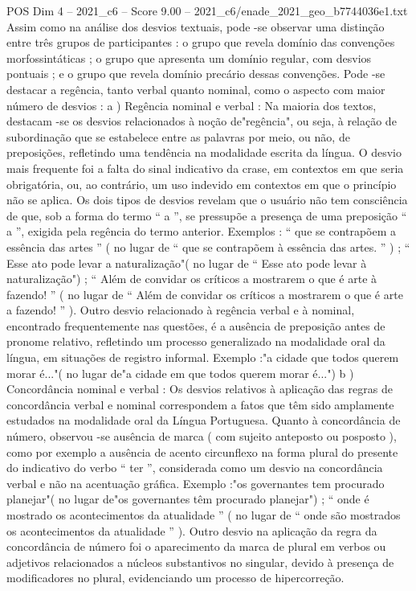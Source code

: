 \begin{textsample}{POS Dim 4 – 2021\_c6 – Score 9.00 – 2021\_c6/enade\_2021\_geo\_b7744036e1.txt}
Assim como na análise dos desvios textuais, pode -se observar uma distinção entre três grupos de participantes : o grupo que revela domínio das convenções morfossintáticas ; o grupo que apresenta um domínio regular, com desvios pontuais ; e o grupo que revela domínio precário dessas convenções.
Pode -se destacar a regência, tanto verbal quanto nominal, como o aspecto com maior número de desvios : a ) Regência nominal e verbal : Na maioria dos textos, destacam -se os desvios relacionados à noção de"regência", ou seja, à relação de subordinação que se estabelece entre as palavras por meio, ou não, de preposições, refletindo uma tendência na modalidade escrita da língua.
O desvio mais frequente foi a falta do sinal indicativo da crase, em contextos em que seria obrigatória, ou, ao contrário, um uso indevido em contextos em que o princípio não se aplica.
Os dois tipos de desvios revelam que o usuário não tem consciência de que, sob a forma do termo “ a ”, se pressupõe a presença de uma preposição “ a ”, exigida pela regência do termo anterior.
Exemplos : “ que se contrapõem a essência das artes ” ( no lugar de “ que se contrapõem à essência das artes. ” ) ; “ Esse ato pode levar a naturalização"( no lugar de “ Esse ato pode levar à naturalização") ; “ Além de convidar os críticos a mostrarem o que é arte à fazendo! ” ( no lugar de “ Além de convidar os críticos a mostrarem o que é arte a fazendo! ” ).
Outro desvio relacionado à regência verbal e à nominal, encontrado frequentemente nas questões, é a ausência de preposição antes de pronome relativo, refletindo um processo generalizado na modalidade oral da língua, em situações de registro informal.
Exemplo :"a cidade que todos querem morar é..."( no lugar de"a cidade em que todos querem morar é...") b ) Concordância nominal e verbal : Os desvios relativos à aplicação das regras de concordância verbal e nominal correspondem a fatos que têm sido amplamente estudados na modalidade oral da Língua Portuguesa.
Quanto à concordância de número, observou -se ausência de marca ( com sujeito anteposto ou posposto ), como por exemplo a ausência de acento circunflexo na forma plural do presente do indicativo do verbo “ ter ”, considerada como um desvio na concordância verbal e não na acentuação gráfica.
Exemplo :"os governantes tem procurado planejar"( no lugar de"os governantes têm procurado planejar") ; “ onde é mostrado os acontecimentos da atualidade ” ( no lugar de “ onde são mostrados os acontecimentos da atualidade ” ).
Outro desvio na aplicação da regra da concordância de número foi o aparecimento da marca de plural em verbos ou adjetivos relacionados a núcleos substantivos no singular, devido à presença de modificadores no plural, evidenciando um processo de hipercorreção.

\end{textsample}
